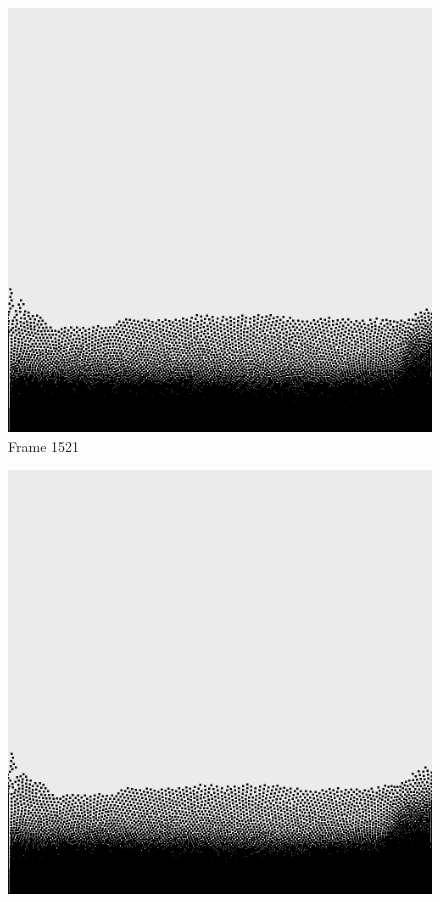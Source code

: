 \documentclass[a4paper, 12pt, oneside]{book}
\begin{document}
\begin{figure}[!ht]
    \addvspace{0.5ex}
        \begin{center}
            \includegraphics[width=\linewidth]{images/test_case_2/1521.png}
            Frame 1521
        \end{center}
    \endminipage
    \hfill
        \begin{center}
            \includegraphics[width=\linewidth]{images/test_case_2/1541.png}

\end{center}
\end{figure}
\end{document}
